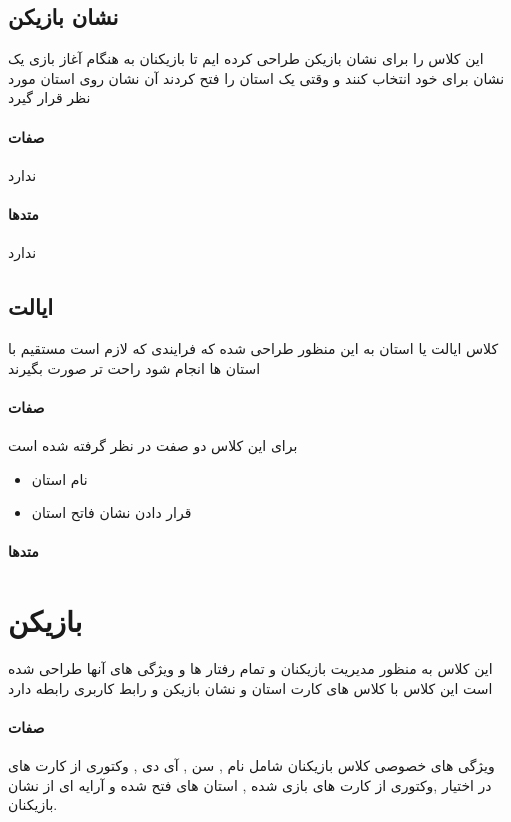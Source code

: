 \documentclass[pdf,titlepage,a4paper]{report}
\begin{document}
	\subsection{نشان بازیکن}
	این کلاس را برای نشان بازیکن طراحی کرده ایم تا بازیکنان به هنگام آغاز بازی یک نشان برای خود انتخاب کنند و وقتی یک استان را فتح کردند آن نشان روی استان مورد نظر قرار گیرد
	\paragraph{صفات}
	ندارد
	\paragraph{متدها}
	ندارد
	
	\subsection{ایالت}
	کلاس ایالت یا استان به این منظور طراحی شده که فرایندی که لازم است مستقیم با استان ها انجام شود راحت تر صورت بگیرند 

	\paragraph{صفات}
	 برای این کلاس دو صفت در نظر گرفته شده است
	 \begin{latin}
	 	\begin{itemize}
	 		\item {} نام استان 
	 		\item {} قرار دادن نشان فاتح استان
	 	\end{itemize}
	 \end{latin}
	\paragraph{متدها}
	
	\section{بازیکن}
	این کلاس به منظور مدیریت بازیکنان و تمام رفتار ها و ویژگی های آنها طراحی شده است 
	 این کلاس با کلاس های کارت استان و نشان بازیکن و رابط کاربری رابطه دارد
	\paragraph{صفات}
	ویژگی های خصوصی کلاس بازیکنان شامل نام , سن , آی دی , وکتوری از کارت های در اختیار ,وکتوری از کارت های بازی شده , استان های فتح شده و آرایه ای از نشان بازیکنان.
\end{document}

